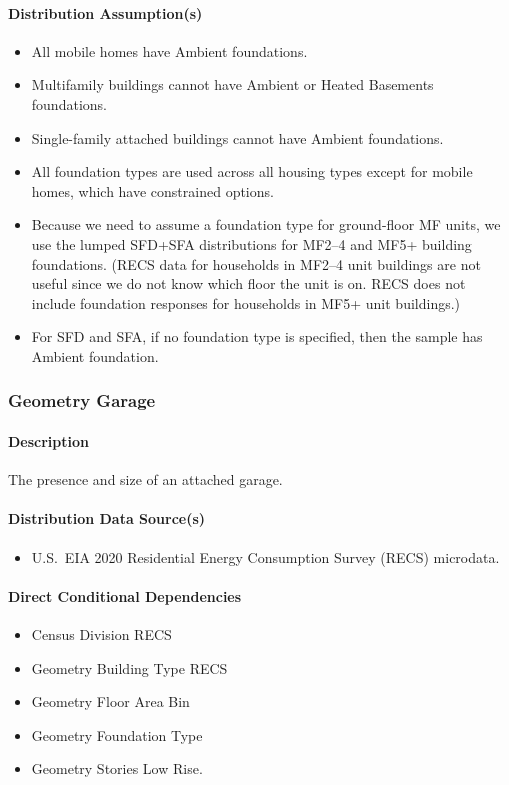 \paragraph{Distribution Assumption(s)}
\begin{itemize}
    \item All mobile homes have Ambient foundations.
    \item Multifamily buildings cannot have Ambient or Heated Basements foundations.
    \item Single-family attached buildings cannot have Ambient foundations.
    \item All foundation types are used across all housing types  except for mobile homes, which have constrained options.
    \item Because we need to assume a foundation type for ground-floor MF units, we use the lumped SFD+SFA distributions for MF2--4 and MF5+ building foundations. (RECS data for households in MF2--4 unit buildings are not useful since we do not know which floor the unit is on. RECS does not include foundation responses for households in MF5+ unit buildings.)
    \item For SFD and SFA, if no foundation type is specified, then the sample has Ambient foundation.
\end{itemize}

\subsubsection{Geometry Garage}
\paragraph{Description}
The presence and size of an attached garage.

\paragraph{Distribution Data Source(s)}
\begin{itemize}
    \item U.S.~EIA 2020 Residential Energy Consumption Survey (RECS) microdata.
\end{itemize}

\paragraph{Direct Conditional Dependencies}
\begin{itemize}
    \item Census Division RECS
    \item Geometry Building Type RECS
    \item Geometry Floor Area Bin
    \item Geometry Foundation Type
    \item Geometry Stories Low Rise.
\end{itemize}

